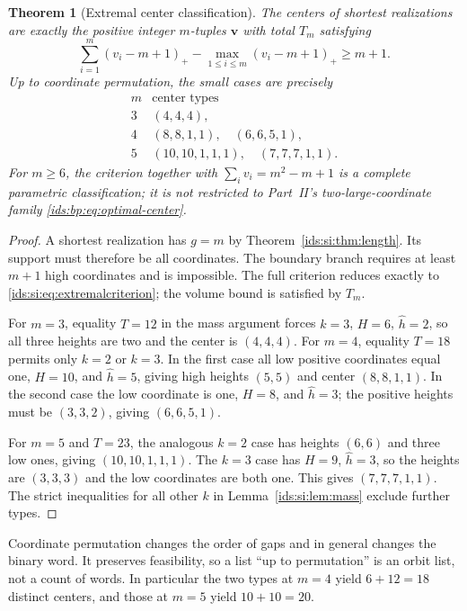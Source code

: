 \documentclass[11pt,letterpaper]{article}
\newtheorem{theorem}{Theorem}[section]
\theoremstyle{definition}\newtheorem{definition}[theorem]{Definition}
\theoremstyle{remark}\newtheorem{remark}[theorem]{Remark}
\theoremstyle{definition}\newtheorem{question}[theorem]{Question}
\begin{document}
\begin{theorem}[Extremal center classification]\label{ids:si:thm:extremal}
The centers of shortest realizations are exactly the positive integer
$m$-tuples $\mathbf v$ with total $T_m$ satisfying
\begin{equation}\label{ids:si:eq:extremalcriterion}
 \sum_{i=1}^{m}(v_i-m+1)_+
       -\max_{1\leq i\leq m}(v_i-m+1)_+\geq m+1.
\end{equation}
Up to coordinate permutation, the small cases are precisely
\begin{equation}\label{ids:si:eq:smallcenters}
\begin{array}{c|l}
 m & \text{center types}\\ \hline
 3 &(4,4,4),\\
 4 &(8,8,1,1),\quad(6,6,5,1),\\
 5 &(10,10,1,1,1),\quad(7,7,7,1,1).
\end{array}
\end{equation}
For $m\geq6$, the criterion together with
$\sum_i v_i=m^2-m+1$ is a complete parametric classification; it is not
restricted to Part~II's two-large-coordinate family
\eqref{ids:bp:eq:optimal-center}.
\end{theorem}
\begin{proof}
A shortest realization has $g=m$ by Theorem~\ref{ids:si:thm:length}. Its support must
therefore be all coordinates. The boundary branch requires at least $m+1$
high coordinates and is impossible. The full criterion reduces exactly to
\eqref{ids:si:eq:extremalcriterion}; the volume bound is satisfied by $T_m$.

For $m=3$, equality $T=12$ in the mass argument forces $k=3$, $H=6$,
$\hat h=2$, so all three heights are two and the center is $(4,4,4)$.
For $m=4$, equality $T=18$ permits only $k=2$ or $k=3$. In the first case
all low positive coordinates equal one, $H=10$, and $\hat h=5$, giving high
heights $(5,5)$ and center $(8,8,1,1)$. In the second case the low coordinate
is one, $H=8$, and $\hat h=3$; the positive heights must be $(3,3,2)$, giving
$(6,6,5,1)$.

For $m=5$ and $T=23$, the analogous $k=2$ case has heights $(6,6)$ and three
low ones, giving $(10,10,1,1,1)$. The $k=3$ case has $H=9$, $\hat h=3$, so the
heights are $(3,3,3)$ and the low coordinates are both one. This gives
$(7,7,7,1,1)$. The strict inequalities for all other $k$ in
Lemma~\ref{ids:si:lem:mass} exclude further types.
\end{proof}

Coordinate permutation changes the order of gaps and in general changes
the binary word. It preserves feasibility, so a list ``up to permutation''
is an orbit list, not a count of words. In particular the two types at
$m=4$ yield $6+12=18$ distinct centers, and those at $m=5$ yield
$10+10=20$.
\end{document}
